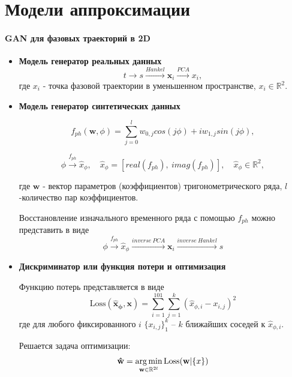 \documentclass[12pt,twoside]{article}
\begin{document}
\section{Модели аппроксимации}
\paragraph{GAN для фазовых траекторий в 2D}

\begin{itemize}
\item \textbf{Модель генератор реальных данных}
\begin{equation}
	t \xrightarrow{} s\xrightarrow{Hankel}  \mathbf{x}_i \xrightarrow{PCA} x_i,
	\label{eq:GAN_real}
\end{equation}
где $x_i$ - точка фазовой траектории в уменьшенном пространстве, $x_i \in \mathbb{R}^2$.
\end{itemize}

\begin{itemize}
\item \textbf{Модель генератор синтетических данных}

\begin{equation}
	f_{ph}(\mathbf{w},\phi) = \sum_{j=0}^{l} w_{0,j}cos(j\phi) + i w_{1,j}sin(j\phi),
\label{eq:f_ph}
\end{equation}

\begin{equation}
	\phi \xrightarrow{f_{ph}} \hat{x}_{\phi},
	\quad
	\hat{x}_{\phi} = [real(f_{ph}),\:imag(f_{ph})],
	\quad
	\hat{x}_{\phi}  \in \mathbb{R}^2,
\label{eq:GAN_fake_1}
\end{equation}
\vspace{\baselineskip}

где $\mathbf{w}$ - вектор параметров (коэффициентов) тригонометрического ряда, $l$-количество пар коэффициентов.

Восстановление изначального временного ряда с помощью $f_{ph}$ можно представить в виде
\begin{equation}
	\phi \xrightarrow{f_{ph}} \hat{x}_{\phi} \xrightarrow{inverse~PCA}  \mathbf{x}_i \xrightarrow{inverse~Hankel}s
\label{eq:GAN_fake_2}
\end{equation}
\end{itemize}

\begin{itemize}
\item \textbf{Дискриминатор или функция потери и оптимизация}

Функцию потерь представляется в виде
\begin{equation}
\textrm{Loss}\mathbf{(\hat{x}_{\phi},x)} =  \sum_{i=1}^{101}\sum_{j=1}^{k}(\hat{x}_{\phi,i} - x_{i,j})^2
\label{eq:L}
\end{equation}
где для любого фиксированного $i$\; $\{x_{i,j}\}_1^k$ -- $k$ ближайших соседей к $\hat{x}_{\phi,i}$.

Решается задача оптимизации:
\begin{equation}
\mathbf{\hat{w}} = \argmin_{\mathbf{w} \in \mathbb{R}^{2l}} \textrm{Loss}(\mathbf{w}|\{x\})
\label{eq:arg_l}
\end{equation}
\end{itemize}
\end{document}
